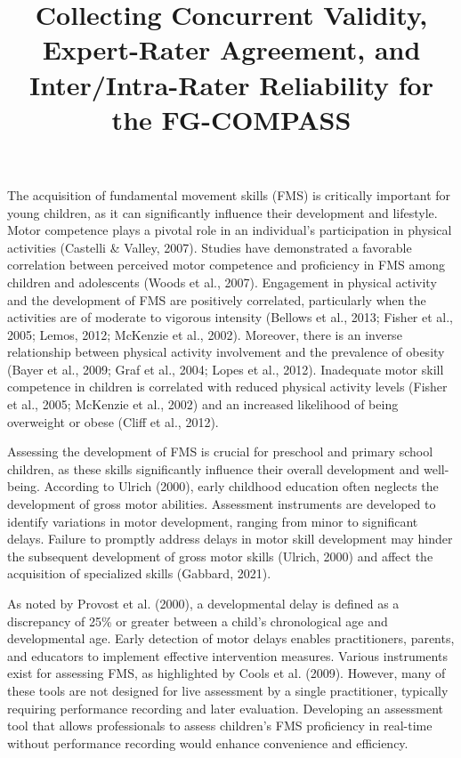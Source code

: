 \documentclass[
  man,
  colorlinks=true,linkcolor=blue,citecolor=blue,urlcolor=blue]{apa7}
\title{Collecting Concurrent Validity, Expert-Rater Agreement, and
Inter/Intra-Rater Reliability for the FG-COMPASS}
\date{}
\begin{document}
\maketitle
The acquisition of fundamental movement skills (FMS) is critically
important for young children, as it can significantly influence their
development and lifestyle. Motor competence plays a pivotal role in an
individual's participation in physical activities (Castelli \& Valley,
2007). Studies have demonstrated a favorable correlation between
perceived motor competence and proficiency in FMS among children and
adolescents (Woods et al., 2007). Engagement in physical activity and
the development of FMS are positively correlated, particularly when the
activities are of moderate to vigorous intensity (Bellows et al., 2013;
Fisher et al., 2005; Lemos, 2012; McKenzie et al., 2002). Moreover,
there is an inverse relationship between physical activity involvement
and the prevalence of obesity (Bayer et al., 2009; Graf et al., 2004;
Lopes et al., 2012). Inadequate motor skill competence in children is
correlated with reduced physical activity levels (Fisher et al., 2005;
McKenzie et al., 2002) and an increased likelihood of being overweight
or obese (Cliff et al., 2012).

Assessing the development of FMS is crucial for preschool and primary
school children, as these skills significantly influence their overall
development and well-being. According to Ulrich (2000), early childhood
education often neglects the development of gross motor abilities.
Assessment instruments are developed to identify variations in motor
development, ranging from minor to significant delays. Failure to
promptly address delays in motor skill development may hinder the
subsequent development of gross motor skills (Ulrich, 2000) and affect
the acquisition of specialized skills (Gabbard, 2021).

As noted by Provost et al. (2000), a developmental delay is defined as a
discrepancy of 25\% or greater between a child's chronological age and
developmental age. Early detection of motor delays enables
practitioners, parents, and educators to implement effective
intervention measures. Various instruments exist for assessing FMS, as
highlighted by Cools et al. (2009). However, many of these tools are not
designed for live assessment by a single practitioner, typically
requiring performance recording and later evaluation. Developing an
assessment tool that allows professionals to assess children's FMS
proficiency in real-time without performance recording would enhance
convenience and efficiency.
\end{document}
